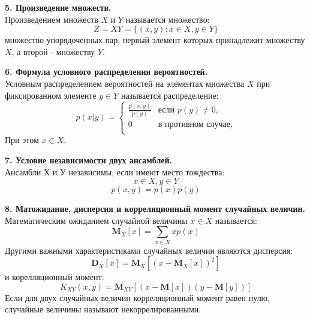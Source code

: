 \documentclass[14pt]{article}
\begin{document}
\bigskip
\textbf{5. Произведение множеств.} \\

Произведением множеств \( X \) и \( Y \) называется множество: \\
\begin{displaymath}
    Z = XY = \{(x, y) : x \in X, y \in Y\}
\end{displaymath}
множество упорядоченных пар, первый элемент которых принадлежит множеству \( X \), а второй - множеству \( Y \).

\bigskip
\textbf{6. Формула условного распределения вероятностей.} \\

Условным распределением вероятностей на элементах множества \( X \) при фиксированном элементе \( y \in Y \) называется распределение: \\
\begin{displaymath}
p(x|y) = \left\{ \begin{array}{ll}
 \frac{p(x, y)}{p(y)} & \textrm{если \(p(y) \neq 0\),}\\
 0 & \textrm{в противном случае,}\\
  \end{array} \right.
\end{displaymath}
При этом \(x \in X\).

\bigskip
\textbf{7. Условие независимости двух ансамблей.} \\

Ансамбли \(Х\) и \(У\) независимы, если имеют место тождества:
\begin{displaymath}
    x \in X, y \in Y
\end{displaymath}
\begin{displaymath}
    p(x, y) = p(x)p(y)
\end{displaymath}

\bigskip
\textbf{8. Матожидание, дисперсия и корреляционный момент случайных величин.} \\

Математическим ожиданием случайной величины \(x \in X\) называется:
\begin{displaymath}
    \textbf{M}_X[x] = \displaystyle\sum_{x \in X} xp(x)
\end{displaymath}
Другими важными характеристиками случайных величин являются дисперсия: \\
\begin{displaymath}
    \textbf{D}_X[x] = \textbf{M}_X[(x - \textbf{M}_X[x])^2]
\end{displaymath}
и корелляционный момент: \\
\begin{displaymath}
    K_{XY}(x,y) = \textbf{M}_{XY}[(x - \textbf{M}[x])(y - \textbf{M}[y])]
\end{displaymath}
Если для двух случайных величин корреляционный момент равен нулю, случайные величины называют некоррелированными. \\
\end{document}
